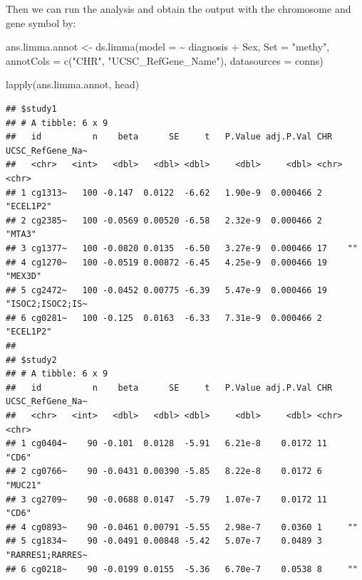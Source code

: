 \documentclass[
]{book}
\newenvironment{Shaded}{\begin{snugshade}}{\end{snugshade}}
\newcommand{\AttributeTok}[1]{\textcolor[rgb]{0.77,0.63,0.00}{#1}}
\newcommand{\FunctionTok}[1]{\textcolor[rgb]{0.00,0.00,0.00}{#1}}
\newcommand{\NormalTok}[1]{#1}
\newcommand{\OtherTok}[1]{\textcolor[rgb]{0.56,0.35,0.01}{#1}}
\newcommand{\SpecialCharTok}[1]{\textcolor[rgb]{0.00,0.00,0.00}{#1}}
\newcommand{\StringTok}[1]{\textcolor[rgb]{0.31,0.60,0.02}{#1}}
\begin{document}
Then we can run the analysis and obtain the output with the chromosome and gene symbol by:

\begin{Shaded}
\begin{Highlighting}[]
\NormalTok{ans.limma.annot }\OtherTok{\textless{}{-}} \FunctionTok{ds.limma}\NormalTok{(}\AttributeTok{model =} \SpecialCharTok{\textasciitilde{}}\NormalTok{ diagnosis }\SpecialCharTok{+}\NormalTok{ Sex,}
                            \AttributeTok{Set =} \StringTok{"methy"}\NormalTok{, }
                            \AttributeTok{annotCols =} \FunctionTok{c}\NormalTok{(}\StringTok{"CHR"}\NormalTok{, }\StringTok{"UCSC\_RefGene\_Name"}\NormalTok{),}
                            \AttributeTok{datasources =}\NormalTok{ conns)}
\end{Highlighting}
\end{Shaded}

\begin{Shaded}
\begin{Highlighting}[]
\FunctionTok{lapply}\NormalTok{(ans.limma.annot, head)}
\end{Highlighting}
\end{Shaded}

\begin{verbatim}
## $study1
## # A tibble: 6 x 9
##   id          n    beta      SE     t   P.Value adj.P.Val CHR   UCSC_RefGene_Na~
##   <chr>   <int>   <dbl>   <dbl> <dbl>     <dbl>     <dbl> <chr> <chr>           
## 1 cg1313~   100 -0.147  0.0122  -6.62   1.90e-9  0.000466 2     "ECEL1P2"       
## 2 cg2385~   100 -0.0569 0.00520 -6.58   2.32e-9  0.000466 2     "MTA3"          
## 3 cg1377~   100 -0.0820 0.0135  -6.50   3.27e-9  0.000466 17    ""              
## 4 cg1270~   100 -0.0519 0.00872 -6.45   4.25e-9  0.000466 19    "MEX3D"         
## 5 cg2472~   100 -0.0452 0.00775 -6.39   5.47e-9  0.000466 19    "ISOC2;ISOC2;IS~
## 6 cg0281~   100 -0.125  0.0163  -6.33   7.31e-9  0.000466 2     "ECEL1P2"       
## 
## $study2
## # A tibble: 6 x 9
##   id          n    beta      SE     t   P.Value adj.P.Val CHR   UCSC_RefGene_Na~
##   <chr>   <int>   <dbl>   <dbl> <dbl>     <dbl>     <dbl> <chr> <chr>           
## 1 cg0404~    90 -0.101  0.0128  -5.91   6.21e-8    0.0172 11    "CD6"           
## 2 cg0766~    90 -0.0431 0.00390 -5.85   8.22e-8    0.0172 6     "MUC21"         
## 3 cg2709~    90 -0.0688 0.0147  -5.79   1.07e-7    0.0172 11    "CD6"           
## 4 cg0893~    90 -0.0461 0.00791 -5.55   2.98e-7    0.0360 1     ""              
## 5 cg1834~    90 -0.0491 0.00848 -5.42   5.07e-7    0.0489 3     "RARRES1;RARRES~
## 6 cg0218~    90 -0.0199 0.0155  -5.36   6.70e-7    0.0538 8     ""
\end{verbatim}
\end{document}
